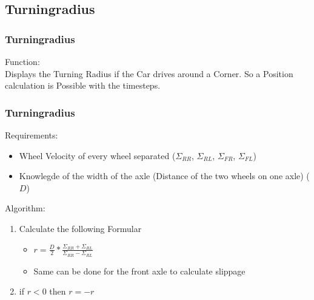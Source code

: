 \documentclass{beamer}
\begin{document}
\subsection{Turningradius}
\begin{frame}
    \frametitle{Turningradius}
    Function:\\
    Displays the Turning Radius if the Car drives around a Corner. So a Position calculation is Possible with the timesteps.
\end{frame}
\begin{frame}
    \frametitle{Turningradius}
    Requirements:
    \begin{itemize}
     \item Wheel Velocity of every wheel separated ($\Sigma_{RR}$, $\Sigma_{RL}$, $\Sigma_{FR}$, $\Sigma_{FL}$)
     \item Knowlegde of the width of the axle (Distance of the two wheels on one axle) ($D$)
    \end{itemize}
    Algorithm:
    \begin{enumerate}
     \item Calculate the following Formular
     \begin{itemize}
        \item $r=\frac{D}{2}*\frac{\Sigma_{RR}+\Sigma_{RL}}{\Sigma_{RR}-\Sigma_{RL}}$
        \item Same can be done for the front axle to calculate slippage
     \end{itemize}
     \item if $r<0$ then $r=-r$
    \end{enumerate}
\end{frame}
\end{document}
